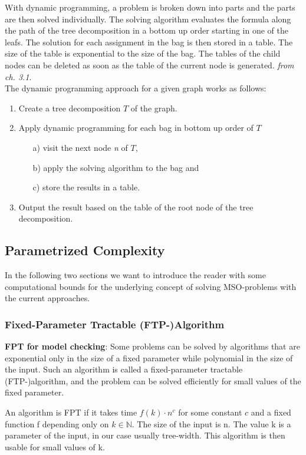 \documentclass[a4paper, 12pt, bibliography=totoc]{scrartcl}
\begin{document}
With dynamic programming, a problem is broken down into parts and the parts are then solved individually. The solving algorithm evaluates the formula along the path of the tree decomposition in a bottom up order starting in one of the leafs. The solution for each assignment in the bag is then stored in a table. The size of the table is exponential to the size of the bag. The tables of the child nodes can be deleted as soon as the table of the current node is generated. \textit{from \cite{DiplomarbeitZisser} ch. 3.1}.\\
The dynamic programming approach for a given graph works as follows:
\begin{enumerate}
	\item Create a tree decomposition ${T}$ of the graph.
	\item Apply dynamic programming for each bag in bottom up order of ${T}$
	\begin{itemize}
		\item[a)] visit the next node \textit{n} of ${T}$,
		\item[b)] apply the solving algorithm to the bag and
		\item[c)] store the results in a table.
	\end{itemize}
	\item Output the result based on the table of the root node of the tree decomposition.
\end{enumerate}


\subsection{Parametrized Complexity}
In the following two sections we want to introduce the reader with some computational bounds for the underlying concept of solving MSO-problems with the current approaches.

\subsubsection{Fixed-Parameter Tractable (FTP-)Algorithm}

\textbf{FPT for model checking}:
Some problems can be solved by algorithms that are exponential only in the size of a fixed parameter while polynomial in the size of the input. Such an algorithm is called a fixed-parameter tractable (FTP-)algorithm, and the problem can be solved efficiently for small values of the fixed parameter. \cite{ParamCompGrohe}
\begin{thm}
	An algorithm is FPT if it takes time $f(k)\cdot n^{c}$ for some constant $c$ and a fixed function f depending only on $k \in \mathbb{N}$. The size of the input is n. 
	The value k is a parameter of the input, in our case usually tree-width. 
	This algorithm is then usable for small values of k.
\end{thm}
\end{document}
